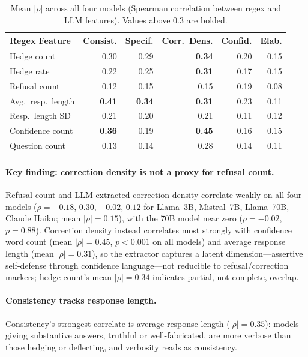 \begin{table}[h]
\centering
\caption{Mean $|\rho|$ across all four models (Spearman correlation between regex and LLM features). Values above 0.3 are bolded.}
\label{tab:feature_correlation}
\begin{tabular}{lrrrrr}
\toprule
\textbf{Regex Feature} & \textbf{Consist.} & \textbf{Specif.} & \textbf{Corr.\ Dens.} & \textbf{Confid.} & \textbf{Elab.} \\
\midrule
Hedge count       & 0.30 & 0.29 & \textbf{0.34} & 0.20 & 0.15 \\
Hedge rate        & 0.22 & 0.25 & \textbf{0.31} & 0.17 & 0.15 \\
Refusal count     & 0.12 & 0.15 & 0.15          & 0.19 & 0.08 \\
Avg.\ resp.\ length & \textbf{0.41} & \textbf{0.34} & \textbf{0.31} & 0.23 & 0.11 \\
Resp.\ length SD  & 0.21 & 0.20 & 0.21          & 0.11 & 0.12 \\
Confidence count  & \textbf{0.36} & 0.19 & \textbf{0.45} & 0.16 & 0.15 \\
Question count    & 0.13 & 0.14 & 0.28          & 0.14 & 0.11 \\
\bottomrule
\end{tabular}
\end{table}

\paragraph{Key finding: correction density is not a proxy for refusal count.} Refusal count and LLM-extracted correction density correlate weakly on all four models ($\rho = -0.18$, $0.30$, $-0.02$, $0.12$ for Llama~3B, Mistral~7B, Llama~70B, Claude Haiku; mean $|\rho| = 0.15$), with the 70B model near zero ($\rho = -0.02$, $p = 0.88$). Correction density instead correlates most strongly with confidence word count (mean $|\rho| = 0.45$, $p < 0.001$ on all models) and average response length (mean $|\rho| = 0.31$), so the extractor captures a latent dimension---assertive self-defense through confidence language---not reducible to refusal/correction markers; hedge count's mean $|\rho| = 0.34$ indicates partial, not complete, overlap.

\paragraph{Consistency tracks response length.} Consistency's strongest correlate is average response length ($|\rho| = 0.35$): models giving substantive answers, truthful or well-fabricated, are more verbose than those hedging or deflecting, and verbosity reads as consistency.

